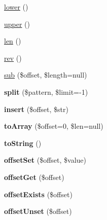 \begin{DoxyCompactItemize}
\item 
\hyperlink{classString_a70de74664e69b6e2fc93d231173df0d2}{lower} ()
\item 
\hyperlink{classString_a07d720a3ea80bbc85f7424d2d7c27701}{upper} ()
\item 
\hyperlink{classString_afa58fa9927bc0240baf185917c849245}{len} ()
\item 
\hyperlink{classString_a47b2739889b38abb582c4eee7d010f91}{rev} ()
\item 
\hyperlink{classString_a23eb86e0ad225b29dd3e02e637a42c37}{sub} (\$offset, \$length=null)
\item 
\hypertarget{classString_af1ceaa53461e40a69de4f14a115d7d56}{
{\bfseries split} (\$pattern, \$limit=-\/1)}
\label{classString_af1ceaa53461e40a69de4f14a115d7d56}

\item 
\hypertarget{classString_abe7d7e1e2b57ab7dcd01d8e2d1d53148}{
{\bfseries insert} (\$offset, \$str)}
\label{classString_abe7d7e1e2b57ab7dcd01d8e2d1d53148}

\item 
\hypertarget{classString_abacf7b1614b42312f4f49ca064980139}{
{\bfseries toArray} (\$offset=0, \$len=null)}
\label{classString_abacf7b1614b42312f4f49ca064980139}

\item 
\hypertarget{classString_aa7ef98a0c1a4b8b375baf8791e7b773c}{
{\bfseries toString} ()}
\label{classString_aa7ef98a0c1a4b8b375baf8791e7b773c}

\item 
\hypertarget{classString_a6a17056cddb17560a093b846c6168537}{
{\bfseries offsetSet} (\$offset, \$value)}
\label{classString_a6a17056cddb17560a093b846c6168537}

\item 
\hypertarget{classString_a4627964e8bc80f485b4b7c1b1c609820}{
{\bfseries offsetGet} (\$offset)}
\label{classString_a4627964e8bc80f485b4b7c1b1c609820}

\item 
\hypertarget{classString_a0ad487f2acca3753cd9d42cf9325225e}{
{\bfseries offsetExists} (\$offset)}
\label{classString_a0ad487f2acca3753cd9d42cf9325225e}

\item 
\hypertarget{classString_af12691beca61c36ac057a8515b2f4bfe}{
{\bfseries offsetUnset} (\$offset)}
\label{classString_af12691beca61c36ac057a8515b2f4bfe}

\end{DoxyCompactItemize}


